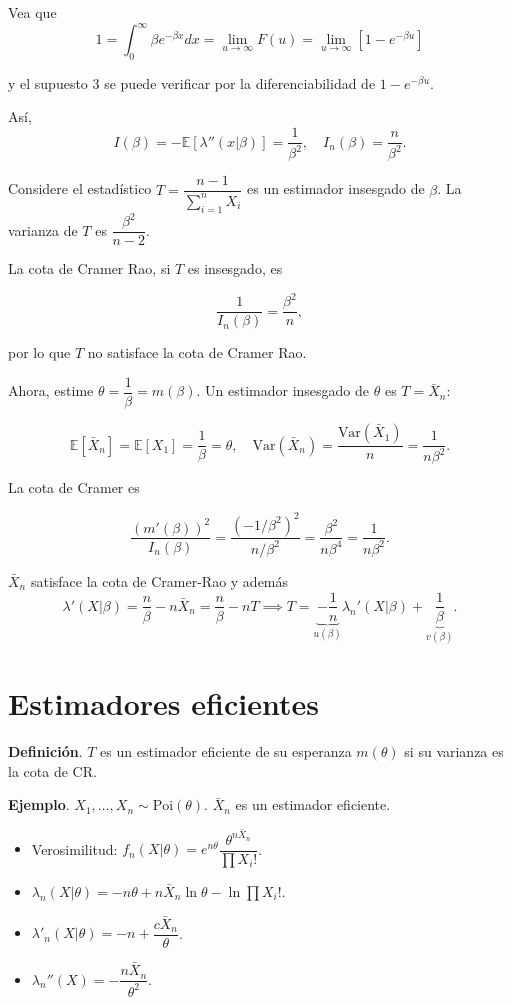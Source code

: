 \documentclass[
  12pt,
]{book}
\begin{document}
Vea que
\[1 = \int_{0}^\infty \beta e^{-\beta x}dx = \lim_{u\to \infty}F(u) = \lim_{u\to \infty}[1-e^{-\beta u}]\]

y el supuesto 3 se puede verificar por la diferenciabilidad de \(1-e^{-\beta u}\).

Así,
\[I(\beta) = -\mathbb E[\lambda''(x|\beta)] = \dfrac 1{\beta^2}, \quad I_n(\beta) = \dfrac{n}{\beta^2}.\]

Considere el estadístico \(T = \dfrac{n-1}{\sum_{i=1}^n X_i}\) es un estimador insesgado de \(\beta\). La varianza de \(T\) es \(\dfrac{\beta^2}{n-2}\).

La cota de Cramer Rao, si \(T\) es insesgado, es

\[\dfrac 1{I_n(\beta)} = \dfrac{\beta^2}{n},\]

por lo que \(T\) no satisface la cota de Cramer Rao.

Ahora, estime \(\theta = \dfrac 1\beta = m(\beta)\). Un estimador insesgado de \(\theta\) es \(T =\bar X_n\):

\[\mathbb E[\bar X_n] = \mathbb E
[X_1] = \dfrac 1\beta  = \theta, \quad \text{Var}(\bar X_n) = \dfrac{\text{Var}(\bar X_1) }{n} = \dfrac 1{n\beta^2}.\]

La cota de Cramer es

\[\dfrac{(m'(\beta))^2}{I_n(\beta)} = \dfrac{(-1/\beta^2)^2}{n/\beta^2} = \dfrac{\beta^2}{n\beta^4} = \dfrac{1}{n\beta^2}.\]

\(\bar X_n\) satisface la cota de Cramer-Rao y además
\[\lambda'(X|\beta) = \dfrac n\beta - n\bar X_n =\dfrac n\beta - nT \implies T = \underbrace{-\dfrac 1n}_{u(\beta)}\lambda_n'(X|\beta)+ \underbrace{\dfrac 1\beta}_{v(\beta)}. \]

\hypertarget{estimadores-eficientes}{%
\section{Estimadores eficientes}\label{estimadores-eficientes}}

\textbf{Definición}. \(T\) es un estimador eficiente de su esperanza \(m(\theta)\) si su varianza es la cota de CR.

\textbf{Ejemplo}. \(X_1,\dots, X_n\sim \text{Poi}(\theta)\). \(\bar X_n\) es un estimador eficiente.

\begin{itemize}
\item
  Verosimilitud: \(f_n(X|\theta) = e ^{n\theta}\dfrac{\theta^{n\bar X_n}}{\prod X_i!}\).
\item
  \(\lambda_n(X|\theta) = -n\theta + n\bar X_n \ln \theta - \ln \prod X_i!\).
\item
  \(\lambda'_n(X|\theta) = -n+\dfrac{c\bar X_n}{\theta}\).
\item
  \(\lambda_n''(X) = -\dfrac{n\bar X_n}{\theta^2}\).
\end{itemize}
\end{document}
